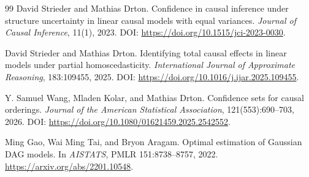 \documentclass{article}
\begin{document}
\begin{thebibliography}{99}
   David Strieder and Mathias Drton. Confidence in causal inference under structure uncertainty in linear causal models with equal variances. \emph{Journal of Causal Inference}, 11(1), 2023. DOI: \url{https://doi.org/10.1515/jci-2023-0030}.

   David Strieder and Mathias Drton. Identifying total causal effects in linear models under partial homoscedasticity. \emph{International Journal of Approximate Reasoning}, 183:109455, 2025. DOI: \url{https://doi.org/10.1016/j.ijar.2025.109455}.

   Y. Samuel Wang, Mladen Kolar, and Mathias Drton. Confidence sets for causal orderings. \emph{Journal of the American Statistical Association}, 121(553):690--703, 2026. DOI: \url{https://doi.org/10.1080/01621459.2025.2542552}.

   Ming Gao, Wai Ming Tai, and Bryon Aragam. Optimal estimation of Gaussian DAG models. In \emph{AISTATS}, PMLR 151:8738--8757, 2022. \url{https://arxiv.org/abs/2201.10548}.

\end{thebibliography}
\end{document}
